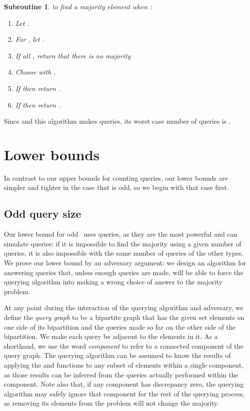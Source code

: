 \documentclass[11pt]{llncs}
\newtheorem{subroutine}{Subroutine}
\begin{document}
\begin{subroutine} to find a majority element when :
\begin{enumerate}
\item Let .
\item For , let .
\item If all , return that there is no majority
\item Choose  with .
\item If  then return .
\item If  then return .
\end{enumerate}
\end{subroutine}

Since  and this algorithm makes  queries, its worst case number of queries
is .
\fi

\section{Lower bounds}

In contrast to our upper bounds for counting queries, our lower bounds are simpler and tighter in the case that  is odd, so we begin with that case first.

\ifFull
\subsection{Odd query size}
\fi

Our lower bound for odd~ uses  queries, as they are the most powerful and can simulate   queries: if it is impossible to find the majority using a given number of  queries, it is also impossible with the same number of queries of the other types. We prove our lower bound by an adversary argument: we design an algorithm for answering queries that, unless enough queries are made, will be able to force the querying algorithm into making a wrong choice of answer to the majority problem.

At any point during the interaction of the querying algorithm and adversary, we define the \emph{query graph} to be a bipartite graph that has the  given set elements on one side of its bipartition and the queries made so far on the other side of the bipartition. We make each query be adjacent to the elements in it. As a shorthand, we use the word \emph{component} to refer to a connected component of the query graph. The querying algorithm can be assumed to know the results of applying the  and  functions to any subset of elements within a single component, as those results can be inferred from the queries actually performed within the component. Note also that, if any component  has discrepancy zero, the querying algorithm may safely ignore that component for the rest of the querying process, as removing its elements from the problem will not change the majority.
\end{document}
